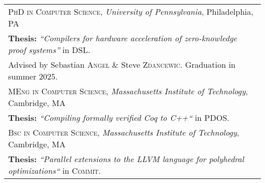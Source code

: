\begin{tabular}{l}
\textsc{PhD in Computer Science}, \emph{University of Pennsylvania}, Philadelphia, PA\\
    \textbf{Thesis:}  \emph{``Compilers for hardware acceleration of zero-knowledge proof systems''} in \textsc{DSL}. \\
                      Advised by Sebastian \textsc{Angel} \& Steve \textsc{Zdancewic}. Graduation in summer 2025. \\[0.5em]
                 \textsc{MEng in Computer Science}, \emph{Massachusetts Institute of Technology}, Cambridge, MA\\
    \textbf{Thesis:}  \emph{``Compiling formally verified Coq to C++``} in \textsc{PDOS}. \\ [0.5em]
                  \textsc{Bsc in Computer Science}, \emph{Massachusetts Institute of Technology}, Cambridge, MA\\
    \textbf{Thesis:}  \emph{``Parallel extensions to the LLVM language for polyhedral optimizations``} in \textsc{Commit}. \\
\end{tabular}
